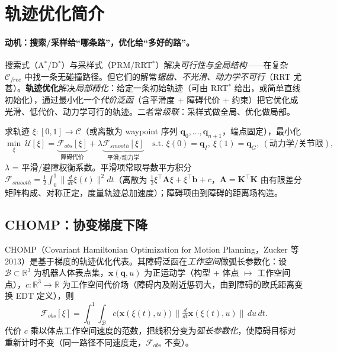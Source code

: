 \section{轨迹优化简介}
\label{sec:plan-traj}

\paragraph{动机：搜索/采样给“哪条路”，优化给“多好的路”。}
搜索式（A$^*$/D$^*$）与采样式（PRM/RRT$^*$）解决\emph{可行性与全局结构}——在复杂 $\mathcal{C}_{free}$ 中找一条无碰撞路径。但它们的解常\emph{锯齿、不光滑、动力学不可行}（RRT 尤甚）。\textbf{轨迹优化}解决\emph{局部精化}：给定一条初始轨迹（可由 RRT$^*$ 给出，或简单直线初始化），通过最小化一个\emph{代价泛函}（含平滑度 + 障碍代价 + 约束）把它优化成光滑、低代价、动力学可行的轨迹。二者常\emph{级联}：采样式做全局、优化做局部。

\begin{definition}[轨迹优化的一般形式]\label{def:plan-trajopt}
求轨迹 $\xi:[0,1]\to\mathcal{C}$（或离散为 waypoint 序列 $\mathbf{q}_0,\dots,\mathbf{q}_{n+1}$，端点固定），最小化
\begin{equation}
  \min_{\xi}\ \mathcal{U}[\xi]=\underbrace{\mathcal{F}_{obs}[\xi]}_{\text{障碍代价}}+\lambda\underbrace{\mathcal{F}_{smooth}[\xi]}_{\text{平滑/动力学}}\quad\text{s.t. }\xi(0)=\mathbf{q}_I,\ \xi(1)=\mathbf{q}_G,\ (\text{动力学/关节限}),
  \label{eq:plan-trajopt}
\end{equation}
$\lambda$ = 平滑/避障权衡系数。平滑项常取导数平方积分 $\mathcal{F}_{smooth}=\tfrac12\int_0^1\|\tfrac{d}{dt}\xi(t)\|^2dt$（离散为 $\tfrac12\xi^\top\mathbf{A}\xi+\xi^\top\mathbf{b}+c$，$\mathbf{A}=\mathbf{K}^\top\mathbf{K}$ 由有限差分矩阵构成、对称正定，度量轨迹总加速度）；障碍项由到障碍的距离场构造。
\end{definition}

\subsection{CHOMP：协变梯度下降}
\label{sec:plan-chomp}

CHOMP（Covariant Hamiltonian Optimization for Motion Planning，Zucker 等 2013\cite{zucker2013chomp}）是基于梯度的轨迹优化代表。其障碍泛函在\emph{工作空间}做弧长参数化：设 $\mathcal{B}\subset\mathbb{R}^3$ 为机器人体表点集，$\mathbf{x}(\mathbf{q},u)$ 为正运动学（构型 + 体点 $\mapsto$ 工作空间点），$c:\mathbb{R}^3\to\mathbb{R}$ 为工作空间代价场（障碍内及附近惩罚大，由到障碍的欧氏距离变换 EDT 定义），则
\begin{equation}
  \mathcal{F}_{obs}[\xi]=\int_0^1\!\!\int_{\mathcal{B}}c\big(\mathbf{x}(\xi(t),u)\big)\,\Big\|\tfrac{d}{dt}\mathbf{x}(\xi(t),u)\Big\|\,du\,dt.
  \label{eq:plan-chomp-obs}
\end{equation}
代价 $c$ 乘以体点工作空间速度的范数，把线积分变为\emph{弧长参数化}，使障碍目标对重新计时不变（同一路径不同速度走，$\mathcal{F}_{obs}$ 不变）。

